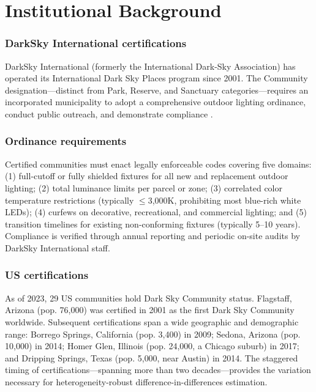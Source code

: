 \documentclass[12pt]{article}
\begin{document}
\section{Institutional Background}

\subsubsection*{DarkSky International certifications} DarkSky International (formerly the International Dark-Sky Association) has operated its International Dark Sky Places program since 2001. The Community designation---distinct from Park, Reserve, and Sanctuary categories---requires an incorporated municipality to adopt a comprehensive outdoor lighting ordinance, conduct public outreach, and demonstrate compliance \citep{darksky2023guidelines}.

\subsubsection*{Ordinance requirements} Certified communities must enact legally enforceable codes covering five domains: (1) full-cutoff or fully shielded fixtures for all new and replacement outdoor lighting; (2) total luminance limits per parcel or zone; (3) correlated color temperature restrictions (typically $\leq$3{,}000K, prohibiting most blue-rich white LEDs); (4) curfews on decorative, recreational, and commercial lighting; and (5) transition timelines for existing non-conforming fixtures (typically 5--10 years). Compliance is verified through annual reporting and periodic on-site audits by DarkSky International staff.

\subsubsection*{US certifications} As of 2023, 29 US communities hold Dark Sky Community status. Flagstaff, Arizona (pop. 76{,}000) was certified in 2001 as the first Dark Sky Community worldwide. Subsequent certifications span a wide geographic and demographic range: Borrego Springs, California (pop. 3{,}400) in 2009; Sedona, Arizona (pop. 10{,}000) in 2014; Homer Glen, Illinois (pop. 24{,}000, a Chicago suburb) in 2017; and Dripping Springs, Texas (pop. 5{,}000, near Austin) in 2014. The staggered timing of certifications---spanning more than two decades---provides the variation necessary for heterogeneity-robust difference-in-differences estimation.
\end{document}
